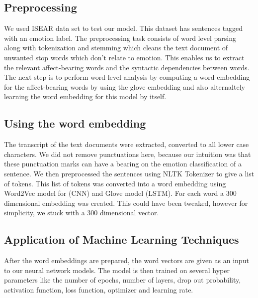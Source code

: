\documentclass[conference]{IEEEtran}
\numberwithin{equation}{section}
\numberwithin{figure}{section}
\numberwithin{table}{section}
\begin{document}
\subsection{Preprocessing}\label{sec:cap-num}
We used ISEAR data set to test our model. This dataset has sentences tagged with an emotion label. The preprocessing task consists of word level parsing along with tokenization and stemming which cleans the text document of unwanted stop words which don't relate to emotion. This enables us to extract the relevant affect-bearing words and the syntactic dependencies between words. The next step is to perform word-level analysis by computing a word embedding for the affect-bearing words by using the glove embedding and also alternaltely learning the word embedding for this model by itself. 


\subsection{Using the word embedding}\label{sec:positioning}
The transcript of the text documents were extracted, converted to all lower case characters. We did not remove punctuations here, because our intuition was that these punctuation marks can have a bearing on the emotion classification of a sentence. We then preprocessed the sentences using NLTK Tokenizer to give a list of tokens. This list of tokens was converted into a word embedding using Word2Vec model for (CNN) and Glove model (LSTM). For each word a 300 dimensional embedding was created. This could have been tweaked, however for simplicity, we stuck with a 300 dimensional vector. \cite{lstm2}


\subsection{Application of Machine Learning Techniques}\label{sec:colour-illustrations}
After the word embeddings are prepared, the word vectors are given as an input to our neural network models. The model is then trained on several hyper parameters like the number of epochs, number of layers, drop out probability, activation function, loss function, optimizer and learning rate.
\end{document}

